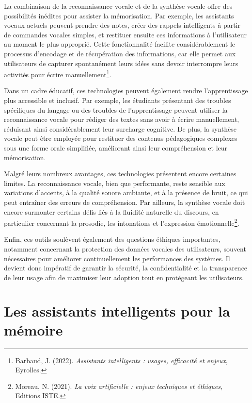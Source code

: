 \documentclass[12pt,a4paper]{report}
\begin{document}
La combinaison de la reconnaissance vocale et de la synthèse vocale offre des possibilités inédites pour assister la mémorisation. Par exemple, les assistants vocaux actuels peuvent prendre des notes, créer des rappels intelligents à partir de commandes vocales simples, et restituer ensuite ces informations à l’utilisateur au moment le plus approprié. Cette fonctionnalité facilite considérablement le processus d’encodage et de récupération des informations, car elle permet aux utilisateurs de capturer spontanément leurs idées sans devoir interrompre leurs activités pour écrire manuellement\footnote{Barbaud, J. (2022). \textit{Assistants intelligents : usages, efficacité et enjeux}, Eyrolles.}.

Dans un cadre éducatif, ces technologies peuvent également rendre l’apprentissage plus accessible et inclusif. Par exemple, les étudiants présentant des troubles spécifiques du langage ou des troubles de l’apprentissage peuvent utiliser la reconnaissance vocale pour rédiger des textes sans avoir à écrire manuellement, réduisant ainsi considérablement leur surcharge cognitive. De plus, la synthèse vocale peut être employée pour restituer des contenus pédagogiques complexes sous une forme orale simplifiée, améliorant ainsi leur compréhension et leur mémorisation.

Malgré leurs nombreux avantages, ces technologies présentent encore certaines limites. La reconnaissance vocale, bien que performante, reste sensible aux variations d’accents, à la qualité sonore ambiante, et à la présence de bruit, ce qui peut entraîner des erreurs de compréhension. Par ailleurs, la synthèse vocale doit encore surmonter certains défis liés à la fluidité naturelle du discours, en particulier concernant la prosodie, les intonations et l’expression émotionnelle\footnote{Moreau, N. (2021). \textit{La voix artificielle : enjeux techniques et éthiques}, Editions ISTE.}.

Enfin, ces outils soulèvent également des questions éthiques importantes, notamment concernant la protection des données vocales des utilisateurs, souvent nécessaires pour améliorer continuellement les performances des systèmes. Il devient donc impératif de garantir la sécurité, la confidentialité et la transparence de leur usage afin de maximiser leur adoption tout en protégeant les utilisateurs.

\section{Les assistants intelligents pour la mémoire}
\end{document}
